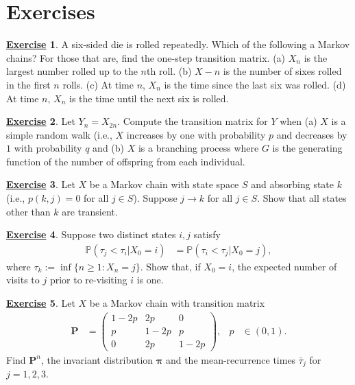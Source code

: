 \documentclass[12pt]{book}
\numberwithin{equation}{chapter}
\theoremstyle{plain}
\numberwithin{theorem}{section}
\theoremstyle{definition}
\newtheorem{exercise}{\underline{Exercise}}
\numberwithin{exercise}{chapter}
\newcommand{\<}{\langle}
\renewcommand{\>}{\rangle}
\renewcommand{\(}{\left(}
\renewcommand{\)}{\right)}
\renewcommand{\[}{\left[}
\renewcommand{\]}{\right]}
\newcommand\Pb{\mathds{P}}
\newcommand\taub{\bar{\tau}}
\newcommand\Pv{\pmb{P}}
\newcommand\piv{\pmb{\pi}}
\begin{document}

\section{Exercises}
\label{sec:exercises-4}

\begin{exercise}
\label{exer:4.1}
A six-sided die is rolled repeatedly.  Which of the following a Markov chains?  For those that are, find the one-step transition matrix.
(a) $X_n$ is the largest number rolled up to the $n$th roll.
(b) $X-n$ is the number of sixes rolled in the first $n$ rolls.
(c) At time $n$, $X_n$ is the time since the last six was rolled.
(d) At time $n$, $X_n$ is the time until the next six is rolled.
\end{exercise}

\begin{exercise}
\label{exer:4.2}
Let $Y_n = X_{2n}$.  Compute the transition matrix for $Y$ when (a) $X$ is a simple random walk (i.e., $X$ increases by one with probability $p$ and decreases by $1$ with probability $q$ and (b) $X$ is a branching process where $G$ is the generating function of the number of offspring from each individual.
\end{exercise}

\begin{exercise}
\label{exer:4.3}
Let $X$ be a Markov chain with state space $S$ and absorbing state $k$ (i.e., $p(k,j)=0$ for all $j \in S$).  Suppose $j \to k$ for all $j \in S$.  Show that all states other than $k$ are transient.
\end{exercise}

\begin{exercise}
\label{exer:4.4}
Suppose two distinct states $i,j$ satisfy
\begin{align}
\Pb(\tau_j < \tau_i | X_0 = i)
	&=	\Pb(\tau_i < \tau_j | X_0 = j) ,
\end{align}
where $\tau_k := \inf\{ n \geq 1 : X_n = j\}$.  Show that, if $X_0 = i$, the expected number of visits to $j$ prior to re-visiting $i$ is one.
\end{exercise}

\begin{exercise}
\label{exer:4.5}
Let $X$ be a Markov chain with transition matrix 
\begin{align}
\Pv
	&=	\( \begin{array}{ccc}
			1-2p & 2p & 0 \\
			p & 1-2p & p \\
			0 & 2p & 1-2p
			\end{array} \) , &
p
	&\in (0,1) .
\end{align}
Find $\Pv^n$, the invariant distribution $\piv$ and the mean-recurrence times $\taub_j$ for $j=1,2,3$.
\end{exercise}
\end{document}
